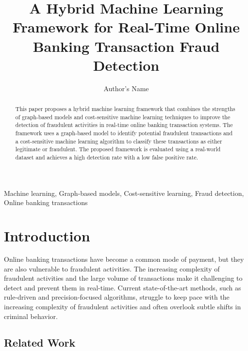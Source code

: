\documentclass{article}
\begin{document}
        \begin{frontmatter}

        \title{A Hybrid Machine Learning Framework for Real-Time Online Banking Transaction Fraud Detection}

        \author{Author's Name}

        \address{Address}


        \begin{abstract}
        This paper proposes a hybrid machine learning framework that combines the strengths of graph-based models and cost-sensitive machine learning techniques to improve the detection of fraudulent activities in real-time online banking transaction systems. The framework uses a graph-based model to identify potential fraudulent transactions and a cost-sensitive machine learning algorithm to classify these transactions as either legitimate or fraudulent. The proposed framework is evaluated using a real-world dataset and achieves a high detection rate with a low false positive rate.
        \end{abstract}

        \begin{keyword}
        Machine learning, Graph-based models, Cost-sensitive learning, Fraud detection, Online banking transactions
        \end{keyword}

        \end{frontmatter}

        \section{Introduction}

        Online banking transactions have become a common mode of payment, but they are also vulnerable to fraudulent activities. The increasing complexity of fraudulent activities and the large volume of transactions make it challenging to detect and prevent them in real-time. Current state-of-the-art methods, such as rule-driven and precision-focused algorithms, struggle to keep pace with the increasing complexity of fraudulent activities and often overlook subtle shifts in criminal behavior.

        \subsection{Related Work}
\end{document}
